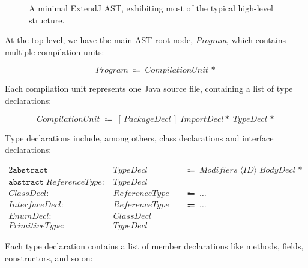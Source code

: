 \documentclass[10pt, twoside, openright]{book}
\begin{document}
\begin{figure}
\centering
{}%
\caption{A minimal ExtendJ AST, exhibiting most of the typical high-level structure.}
\label{fig:exj-grammar1}
\end{figure}

At the top level, we have the main AST root node, \emph{Program}, which contains
multiple compilation units:

\begin{equation*}
\textit{Program} \; \Coloneqq \; \textit{CompilationUnit}\,\ast
\end{equation*}

\noindent
Each compilation unit represents one Java source file, containing a list of
type declarations:

\begin{equation*}
\textit{CompilationUnit} \; \Coloneqq \; [\,\textit{PackageDecl}\,] \; \textit{ImportDecl}\ast \; \textit{TypeDecl}\,\ast
\end{equation*}

\noindent
Type declarations include, among others, class declarations and interface declarations:

\begin{alignat*}{2}
\texttt{abstract} & \; \textit{TypeDecl}    & & \; \Coloneqq \; \textit{Modifiers} \; \langle\textit{ID}\rangle \; \textit{BodyDecl}\,\ast \\
\texttt{abstract} \; \textit{ReferenceType} : & \; \textit{TypeDecl}  & & \\
\textit{ClassDecl} : & \; \textit{ReferenceType}  & & \; \Coloneqq \; \ldots \\
\textit{InterfaceDecl} : & \; \textit{ReferenceType}  & & \; \Coloneqq \; \ldots \\
\textit{EnumDecl} : & \; \textit{ClassDecl}  & & \\
\textit{PrimitiveType} : & \; \textit{TypeDecl}  & &
\end{alignat*}

\noindent
Each type declaration contains a list of member declarations like methods, fields, constructors,
and so on:
\end{document}
